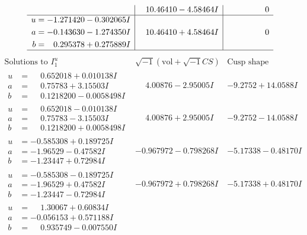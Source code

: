 \documentclass[1p]{elsarticle_modified}
\theoremstyle{definition}
\newcommand{\I}{\sqrt{-1}}
\begin{document}
$$\begin{array}{c|c|c}
 & \phantom{-}10.46410 - 4.58464 I & \phantom{-0.000000 } 0 \\ \hline\begin{aligned}
u &= -1.271420 - 0.302065 I \\
a &= -0.143630 - 1.274350 I \\
b &= \phantom{-}0.295378 + 0.275889 I\end{aligned}
 & \phantom{-}10.46410 + 4.58464 I & \phantom{-0.000000 } 0\\
 \hline 
 \end{array}$$\newpage$$\begin{array}{c|c|c}  
\text{Solutions to }I^u_{1}& \I (\text{vol} + \sqrt{-1}CS) & \text{Cusp shape}\\
 \hline 
\begin{aligned}
u &= \phantom{-}0.652018 + 0.010138 I \\
a &= \phantom{-}0.75783 + 3.15503 I \\
b &= \phantom{-}0.1218200 - 0.0058498 I\end{aligned}
 & \phantom{-}4.00876 - 2.95005 I & -9.2752 + 14.0588 I \\ \hline\begin{aligned}
u &= \phantom{-}0.652018 - 0.010138 I \\
a &= \phantom{-}0.75783 - 3.15503 I \\
b &= \phantom{-}0.1218200 + 0.0058498 I\end{aligned}
 & \phantom{-}4.00876 + 2.95005 I & -9.2752 - 14.0588 I \\ \hline\begin{aligned}
u &= -0.585308 + 0.189725 I \\
a &= -1.96529 - 0.47582 I \\
b &= -1.23447 + 0.72984 I\end{aligned}
 & -0.967972 - 0.798268 I & -5.17338 - 0.48170 I \\ \hline\begin{aligned}
u &= -0.585308 - 0.189725 I \\
a &= -1.96529 + 0.47582 I \\
b &= -1.23447 - 0.72984 I\end{aligned}
 & -0.967972 + 0.798268 I & -5.17338 + 0.48170 I \\ \hline\begin{aligned}
u &= \phantom{-}1.30067 + 0.60834 I \\
a &= -0.056153 + 0.571188 I \\
b &= \phantom{-}0.935749 - 0.007550 I\end{aligned}

\end{array}$$
\end{document}
